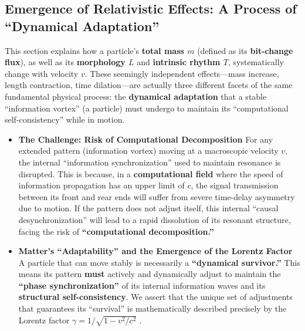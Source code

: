 \documentclass[11pt, a4paper]{article}
\begin{document}
\subsection{Emergence of Relativistic Effects: A Process of ``Dynamical Adaptation''}
This section explains how a particle's \textbf{total mass $m$} (defined as its \textbf{bit-change flux}), as well as its \textbf{morphology $L$} and \textbf{intrinsic rhythm $T$}, systematically change with velocity $v$. These seemingly independent effects—mass increase, length contraction, time dilation—are actually three different facets of the same fundamental physical process: the \textbf{dynamical adaptation} that a stable ``information vortex'' (a particle) must undergo to maintain its ``computational self-consistency'' while in motion.

\begin{itemize}
    \item \textbf{The Challenge: Risk of Computational Decomposition}
    For any extended pattern (information vortex) moving at a macroscopic velocity $v$, the internal ``information synchronization'' used to maintain resonance is disrupted. This is because, in a \textbf{computational field} where the speed of information propagation has an upper limit of $c$, the signal transmission between its front and rear ends will suffer from severe time-delay asymmetry due to motion. If the pattern does not adjust itself, this internal ``causal desynchronization'' will lead to a rapid dissolution of its resonant structure, facing the risk of \textbf{``computational decomposition.''}

    \item \textbf{Matter's ``Adaptability'' and the Emergence of the Lorentz Factor}
    A particle that can move stably is necessarily a \textbf{``dynamical survivor.''} This means its pattern \textbf{must} actively and dynamically adjust to maintain the \textbf{``phase synchronization''} of its internal information waves and its \textbf{structural self-consistency}. We assert that the unique set of adjustments that guarantees its ``survival'' is mathematically described precisely by the Lorentz factor $\gamma = 1 / \sqrt{1 - v^2/c^2}$ \cite{Einstein1905}.


\end{itemize}
\end{document}
